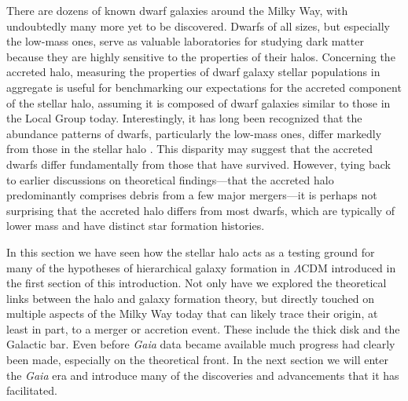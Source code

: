 There are dozens of known dwarf galaxies around the Milky Way, with undoubtedly many more yet to be discovered. Dwarfs of all sizes, but especially the low-mass ones, serve as valuable laboratories for studying dark matter \parencite[][]{bullock17,simon19,sales22} because they are highly sensitive to the properties of their halos. Concerning the accreted halo, measuring the properties of dwarf galaxy stellar populations in aggregate is useful for benchmarking our expectations for the accreted component of the stellar halo, assuming it is composed of dwarf galaxies similar to those in the Local Group today. Interestingly, it has long been recognized that the abundance patterns of dwarfs, particularly the low-mass ones, differ markedly from those in the stellar halo \parencite[e.g.][]{tolstoy03,venn04}. This disparity may suggest that the accreted dwarfs differ fundamentally from those that have survived. However, tying back to earlier discussions on theoretical findings---that the accreted halo predominantly comprises debris from a few major mergers---it is perhaps not surprising that the accreted halo differs from most dwarfs, which are typically of lower mass and have distinct star formation histories.

In this section we have seen how the stellar halo acts as a testing ground for many of the hypotheses of hierarchical galaxy formation in $\Lambda$CDM introduced in the first section of this introduction. Not only have we explored the theoretical links between the halo and galaxy formation theory, but directly touched on multiple aspects of the Milky Way today that can likely trace their origin, at least in part, to a merger or accretion event. These include the thick disk and the Galactic bar. Even before \textit{Gaia} data became available much progress had clearly been made, especially on the theoretical front. In the next section we will enter the \textit{Gaia} era and introduce many of the discoveries and advancements that it has facilitated.